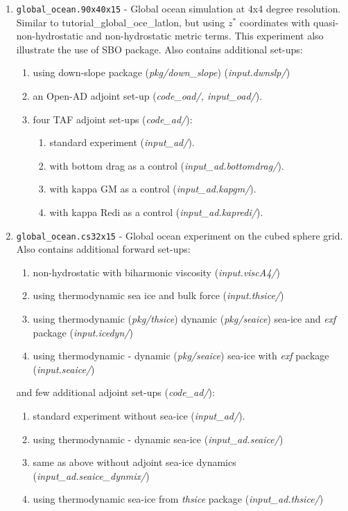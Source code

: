 \begin{enumerate}
\item \texttt{global\_ocean.90x40x15} - Global ocean simulation at 4x4
  degree resolution. Similar to tutorial\_global\_oce\_latlon, but using
  $z^*$ coordinates with quasi-non-hydrostatic and non-hydrostatic metric terms.
  This experiment also illustrate the use of SBO package.
  Also contains additional set-ups:
  \begin{enumerate}
   \item using down-slope package ({\it pkg/down\_slope}) ({\it input.dwnslp/})
   \item an Open-AD adjoint set-up ({\it code\_oad/, input\_oad/}).
   \item four TAF adjoint set-ups ({\it code\_ad/}):
   \begin{enumerate}
     \item standard experiment ({\it input\_ad/}).
     \item with bottom drag as a control ({\it input\_ad.bottomdrag/}).
     \item with kappa GM as a control ({\it input\_ad.kapgm/}).
     \item with kappa Redi as a control ({\it input\_ad.kapredi/}).
   \end{enumerate}
  \end{enumerate}

\item \texttt{global\_ocean.cs32x15} - Global ocean experiment on the
  cubed sphere grid.\\
  Also contains additional forward set-ups:
  \begin{enumerate}
   \item non-hydrostatic with biharmonic viscosity ({\it input.viscA4/})
   \item using thermodynamic sea ice and bulk force ({\it input.thsice/})
   \item using thermodynamic ({\it pkg/thsice}) dynamic ({\it pkg/seaice}) sea-ice
         and {\it exf} package ({\it input.icedyn/})
   \item using thermodynamic - dynamic ({\it pkg/seaice}) sea-ice
         with {\it exf} package ({\it input.seaice/})
  \end{enumerate}
  and few additional adjoint set-ups ({\it code\_ad/}):
  \begin{enumerate}
   \item standard experiment without sea-ice ({\it input\_ad/}).
   \item using thermodynamic - dynamic sea-ice ({\it input\_ad.seaice/})
   \item same as above without adjoint sea-ice dynamics ({\it input\_ad.seaice\_dynmix/})
   \item using thermodynamic sea-ice from {\it thsice} package ({\it input\_ad.thsice/})
  \end{enumerate}


\end{enumerate}
